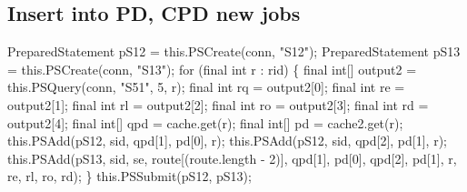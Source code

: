 \subsection{Insert into PD, CPD new jobs}
\nwenddocs{}\endmoddef{}
PreparedStatement pS12 = this.PSCreate(conn, "S12");
PreparedStatement pS13 = this.PSCreate(conn, "S13");
for (final int r : rid) \{
  final int[] output2 = this.PSQuery(conn, "S51", 5, r);
  final int rq = output2[0];
  final int re = output2[1];
  final int rl = output2[2];
  final int ro = output2[3];
  final int rd = output2[4];
  final int[] qpd = cache.get(r);
  final int[]  pd = cache2.get(r);
  this.PSAdd(pS12, sid, qpd[1], pd[0], r);
  this.PSAdd(pS12, sid, qpd[2], pd[1], r);
  this.PSAdd(pS13, sid, se, route[(route.length - 2)], qpd[1], pd[0], qpd[2], pd[1],
        r, re, rl, ro, rd);
\}
this.PSSubmit(pS12, pS13);
\nwendcode{}\nwdocspar

